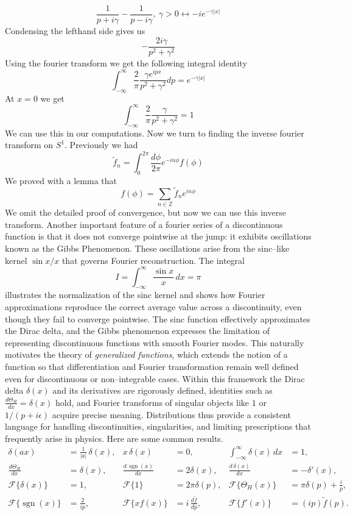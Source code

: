 \documentclass[11pt,a4paper]{article}
\begin{document}
$$
\frac{1}{p+i\gamma} - \frac{1}{p-i\gamma},\ \gamma>0 \leftrightarrow -ie^{-\gamma |x|}
$$
Condensing the lefthand side gives us
$$
-\frac{2i\gamma}{p^{2}+\gamma^{2}}
$$
Using the fourier transform we get the following integral identity
$$
\int_{-\infty}^{\infty}\frac{2}{\pi}\frac{\gamma e^{ipx}}{p^{2}+\gamma^{2}} dp= e^{-\gamma|x|}
$$
At $x=0$ we get
$$
\int_{-\infty}^{\infty}\frac{2}{\pi}\frac{\gamma}{p^{2}+\gamma^{2}} = 1
$$
We can use this in our computations. Now we turn to finding the inverse fourier transform on $S^{1}$. Previously we had
$$
\tilde{f}_{n} = \int_{0}^{2\pi}\frac{d\phi}{2\pi}e^{-in\phi}f(\phi)
$$
We proved with a lemma that 
$$
f(\phi)=\sum_{n\in\mathbb{Z}}\tilde{f}_{n}e^{in\phi}
$$
We omit the detailed proof of convergence, but now we can use this inverse transform. Another important feature of a fourier series of a discontinuous function is that it
does not converge pointwise at the jump: it exhibits oscillations known as the Gibbs Phenomenon. 
These oscillations arise from the sinc--like kernel $\sin x/x$ that governs Fourier reconstruction. 
The integral
\[
I = \int_{-\infty}^{\infty}\frac{\sin x}{x}\,dx = \pi
\]
illustrates the normalization of the sinc kernel and shows how Fourier approximations 
reproduce the correct average value across a discontinuity, even though they fail to converge 
pointwise. The sinc function effectively approximates the Dirac delta, and the Gibbs phenomenon 
expresses the limitation of representing discontinuous functions with smooth Fourier modes. 
This naturally motivates the theory of \textit{generalized functions}, which extends the notion of 
a function so that differentiation and Fourier transformation remain well defined even for 
discontinuous or non--integrable cases. Within this framework the Dirac delta $\delta(x)$ and its 
derivatives are rigorously defined, identities such as $\frac{d\Theta_{H}}{dx}=\delta(x)$ hold, and 
Fourier transforms of singular objects like $1$ or $1/(p+i\epsilon)$ acquire precise meaning. 
Distributions thus provide a consistent language for handling discontinuities, singularities, and 
limiting prescriptions that frequently arise in physics.
Here are some common results.
\begin{align*}
	\delta(ax) &= \frac{1}{|a|}\,\delta(x), &
	x\,\delta(x) &= 0, &
	\int_{-\infty}^{\infty}\delta(x)\,dx &= 1, \\[4pt]
	\frac{d\Theta_{H}}{dx} &= \delta(x), &
	\frac{d\,\operatorname{sgn}(x)}{dx} &= 2\delta(x), &
	\frac{d\,\delta(x)}{dx} &= -\delta'(x), \\[4pt]
	\mathcal{F}\{\delta(x)\} &= 1, &
	\mathcal{F}\{1\} &= 2\pi\delta(p), &
	\mathcal{F}\{\Theta_{H}(x)\} &= \pi\delta(p) + \frac{i}{p}, \\[4pt]
	\mathcal{F}\{\operatorname{sgn}(x)\} &= \frac{2}{ip}, &
	\mathcal{F}\{x f(x)\} &= i\,\frac{d\tilde{f}}{dp}, &
	\mathcal{F}\{f'(x)\} &= (ip)\tilde{f}(p).
\end{align*}
\end{document}
